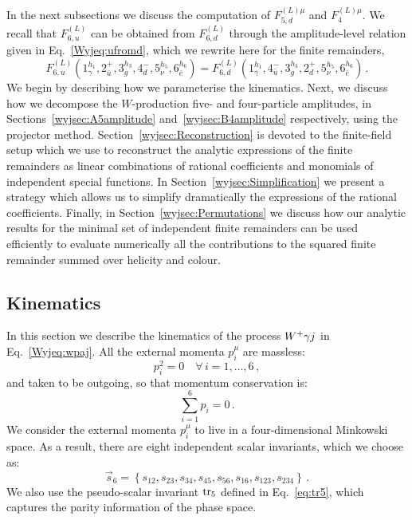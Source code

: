 \documentclass[main.tex]{subfiles}
\begin{document}
In the next subsections we discuss the computation of $F_{5,d}^{(L)\mu}$ and $F_{4}^{(L)\mu}$. We recall that $F_{6,u}^{(L)}$ can be obtained from $F_{6,d}^{(L)}$ through the amplitude-level relation given in Eq.~\eqref{Wyjeq:ufromd}, which we rewrite here for the finite remainders,
\begin{equation}  \label{Wyjeq:ufromdF}
F_{6,u}^{(L)}(1^{h_1}_\gamma,2^+_{\bar{u}},3^{h_3}_g,4^-_d,5^{h_5}_{\nu},6^{h_6}_{\bar{e}})
=
F_{6,d}^{(L)}(1^{h_1}_\gamma,4^-_{\bar{u}},3^{h_3}_g,2^+_d,5^{h_5}_{\nu},6^{h_6}_{\bar{e}}) \,.
\end{equation}
We begin by describing how we parameterise the kinematics. Next, we discuss how we decompose the $W$-production five- and four-particle amplitudes, in Sections~\ref{wyjsec:A5amplitude} and~\ref{wyjsec:B4amplitude} respectively, using the projector method. Section~\ref{wyjsec:Reconstruction} is devoted to the finite-field setup which we use to reconstruct the analytic expressions of the finite remainders as linear combinations of rational coefficients and monomials of independent special functions. In Section~\ref{wyjsec:Simplification} we present a strategy which allows us to simplify dramatically the expressions of the rational coefficients. Finally, in Section~\ref{wyjsec:Permutations} we discuss how our analytic results for the minimal set of independent finite remainders can be used efficiently to evaluate numerically all the contributions to the squared finite remainder summed over helicity and colour.


\subsection{Kinematics}
\label{wyjsec:Kinematics}
In this section we describe the kinematics of the process $W^+\gamma j$ in Eq.~\eqref{Wyjeq:wpaj}.
All the external momenta $p_i^{\mu}$ are massless:
\begin{equation}
p_i^2 = 0 \quad \forall \, i = 1,\ldots,6 \,,
\end{equation}
and taken to be outgoing, so that momentum conservation is:
\begin{equation}
\sum_{i=1}^{6} p_i = 0 \,.
\end{equation}
We consider the external momenta $p_i^{\mu}$ to live in a four-dimensional Minkowski space. As a result, there are eight independent scalar invariants, which we choose as:
\begin{equation}
\vec{s}_{6} = \left\{ s_{12},s_{23},s_{34},s_{45},s_{56},s_{16},s_{123},s_{234}\right\} \,.
\label{Wyjeq:sijs6pt}
\end{equation}
We also use the pseudo-scalar invariant $\operatorname{\rm tr}_5$ defined in Eq.~\ref{eq:tr5}, which captures the parity information of the phase space. 
\end{document}
